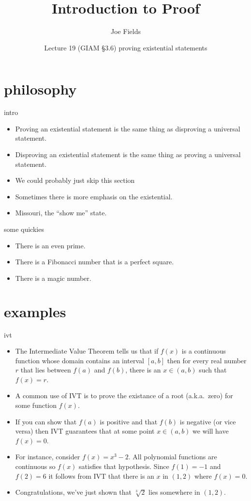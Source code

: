 \documentclass[landscape]{beamer}
\author{Joe Fields}
\title{Introduction to Proof}
\date{Lecture 19 (GIAM \S 3.6) \newline proving existential statements}
\institute[SCSU]{ {\tt fieldsj1@southernct.edu} }
\begin{document}
\begin{frame}[plain]
  \titlepage
\end{frame}

\section{philosophy}

\begin{frame}{intro}
\begin{itemize}
\item Proving an existential statement is the same thing as disproving a universal statement. \pause
\item Disproving an existential statement is the same thing as proving a universal statement. \pause
\item We could probably just skip this section\textellipsis \pause
\item Sometimes there is more emphasis on the existential. \pause
\item Missouri, the ``show me'' state.
\end{itemize}
\end{frame}

\begin{frame}{some quickies}
\begin{itemize}
\item There is an even prime. \pause
\item There is a Fibonacci number that is a perfect square.\pause
\item There is a magic number.
\end{itemize}
\end{frame}

\section{examples}

\begin{frame}{ivt}
\begin{itemize}
\item The Intermediate Value Theorem tells us that if $f(x)$ is a continuous function whose domain contains an interval $[a,b]$ then for every real number $r$ that lies between $f(a)$ and $f(b)$, there is an $x \in (a,b)$ such that $f(x) = r$. \pause
\item A common use of IVT is to prove the existance of a root (a.k.a.\ zero) for some function $f(x)$. \pause
\item If you can show that $f(a)$ is positive and that $f(b)$ is negative (or vice versa) then IVT guarantees
that at some point $x \in (a,b)$ we will have $f(x) = 0$. \pause
\item For instance, consider $f(x) = x^3 - 2$.  All polynomial functions are continuous so $f(x)$ satisfies that hypothesis.  Since $f(1) = -1$ and $f(2) = 6$ it follows from IVT that there is an $x$ in $(1,2)$ where $f(x)=0$. \pause
\item Congratulations, we've just shown that $\sqrt[3]{2}$ lies somewhere in $(1,2)$.
\end{itemize}
\end{frame}
\end{document}
